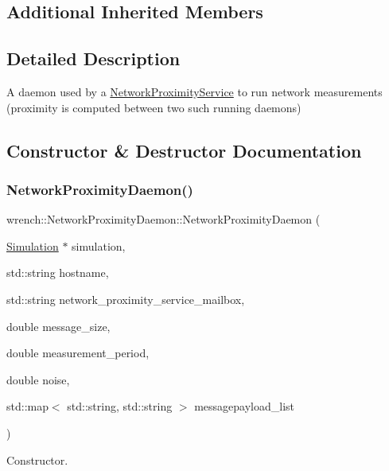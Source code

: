 \subsection*{Additional Inherited Members}


\subsection{Detailed Description}
A daemon used by a \hyperlink{classwrench_1_1_network_proximity_service}{Network\+Proximity\+Service} to run network measurements (proximity is computed between two such running daemons) 

\subsection{Constructor \& Destructor Documentation}
\mbox{\label{classwrench_1_1_network_proximity_daemon_af9584c1e4c1c8197418b22d2b458f270}} 
\subsubsection{\texorpdfstring{Network\+Proximity\+Daemon()}{NetworkProximityDaemon()}}
{\footnotesize\ttfamily wrench\+::\+Network\+Proximity\+Daemon\+::\+Network\+Proximity\+Daemon (\begin{DoxyParamCaption}\item[{\hyperlink{classwrench_1_1_simulation}{Simulation} $\ast$}]{simulation,  }\item[{std\+::string}]{hostname,  }\item[{std\+::string}]{network\+\_\+proximity\+\_\+service\+\_\+mailbox,  }\item[{double}]{message\+\_\+size,  }\item[{double}]{measurement\+\_\+period,  }\item[{double}]{noise,  }\item[{std\+::map$<$ std\+::string, std\+::string $>$}]{messagepayload\+\_\+list }\end{DoxyParamCaption})}



Constructor. 


